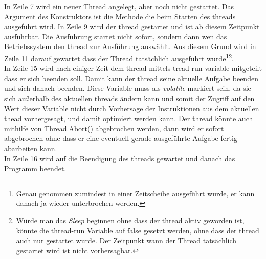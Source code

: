 In Zeile 7 wird ein neuer Thread angelegt, aber noch nicht gestartet. Das Argument des Konstruktors ist die Methode die beim Starten des threads ausgeführt wird. In Zeile 9 wird der thread gestartet und ist ab diesem Zeitpunkt ausführbar. Die Ausführung startet nicht sofort, sondern dann wen das Betriebssystem den thread zur Ausführung auswählt. Aus diesem Grund wird in Zeile 11 darauf gewartet dass der Thread tatsächlich ausgeführt wurde\footnote{Genau genommen zumindest in einer Zeitscheibe ausgeführt wurde, er kann danach ja wieder unterbrochen werden.}\footnote{Würde man das \textit{Sleep} beginnen ohne dass der thread aktiv geworden ist, könnte die thread-run Variable auf false gesetzt werden, ohne dass der thread auch nur gestartet wurde. Der Zeitpunkt wann der Thread tatsächlich gestartet wird ist nicht vorhersagbar.}.
\\In Zeile 15 wird nach einiger Zeit dem thread mittels tread-run variable mitgeteilt dass er sich beenden soll. Damit kann der thread seine aktuelle Aufgabe beenden und sich danach beenden. Diese Variable muss als \emph{volatile} markiert sein, da sie sich außerhalb des aktuellen threads ändern kann und somit der Zugriff auf den Wert dieser Variable nicht durch Vorhersage der Instruktionen aus dem aktuellen thead vorhergesagt, und damit optimiert werden kann.\cite{ms_volatile} Der thread könnte auch mithilfe von Thread.Abort() abgebrochen werden, dann wird er sofort abgebrochen ohne dass er eine eventuell gerade ausgeführte Aufgabe fertig abarbeiten kann. 
\\In Zeile 16 wird auf die Beendigung des threads gewartet und danach das Programm beendet.


